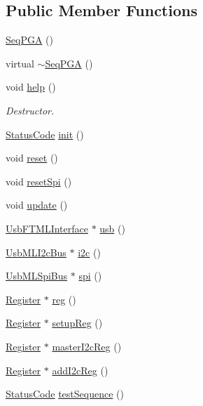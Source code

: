 \subsection*{Public Member Functions}
\begin{DoxyCompactItemize}
\item 
\hyperlink{classSeqPGA_a032240de5048a496dcce57ac28e10f65}{Seq\+P\+GA} ()
\item 
virtual \hyperlink{classSeqPGA_ac36a18cf2f56796a78fb91a1afc5cc1b}{$\sim$\+Seq\+P\+GA} ()
\item 
void \hyperlink{classSeqPGA_ae651bb2d5ac33e863951499c638655fe}{help} ()
\begin{DoxyCompactList}\small\item\em Destructor. \end{DoxyCompactList}\item 
\hyperlink{classStatusCode}{Status\+Code} \hyperlink{classSeqPGA_aba1ead90de9e6f14042d8838db5ebe5b}{init} ()
\item 
void \hyperlink{classSeqPGA_aaadcbdd7ad7c96d2d69549b820da6809}{reset} ()
\item 
void \hyperlink{classSeqPGA_a52f122a1767691eb950a4aae5981edfc}{reset\+Spi} ()
\item 
void \hyperlink{classSeqPGA_a0003d286a27a82024d84b392edab2c3b}{update} ()
\item 
\hyperlink{classUsbFTMLInterface}{Usb\+F\+T\+M\+L\+Interface} $\ast$ \hyperlink{classSeqPGA_a10c68ea9de38eb0445d47e4b21b580a1}{usb} ()
\item 
\hyperlink{classUsbMLI2cBus}{Usb\+M\+L\+I2c\+Bus} $\ast$ \hyperlink{classSeqPGA_ad1629388bbd38b013110ee03a1eea339}{i2c} ()
\item 
\hyperlink{classUsbMLSpiBus}{Usb\+M\+L\+Spi\+Bus} $\ast$ \hyperlink{classSeqPGA_a9c6993bb241b4cc474d525f65696099a}{spi} ()
\item 
\hyperlink{classRegister}{Register} $\ast$ \hyperlink{classSeqPGA_a43c48f29313ca63046cc8efc6cc73e23}{reg} ()
\item 
\hyperlink{classRegister}{Register} $\ast$ \hyperlink{classSeqPGA_a83598ab914c8e3ee5afa34c5e6e7fdf4}{setup\+Reg} ()
\item 
\hyperlink{classRegister}{Register} $\ast$ \hyperlink{classSeqPGA_a3906fe0cdfd9042a67c0fa35ae75147a}{master\+I2c\+Reg} ()
\item 
\hyperlink{classRegister}{Register} $\ast$ \hyperlink{classSeqPGA_a80eec67d433c12f8fcdf1ad73c6b8f59}{add\+I2c\+Reg} ()
\item 
\hyperlink{classStatusCode}{Status\+Code} \hyperlink{classSeqPGA_a299f2826e5edba5636f0f41233683156}{test\+Sequence} ()

\end{DoxyCompactItemize}
